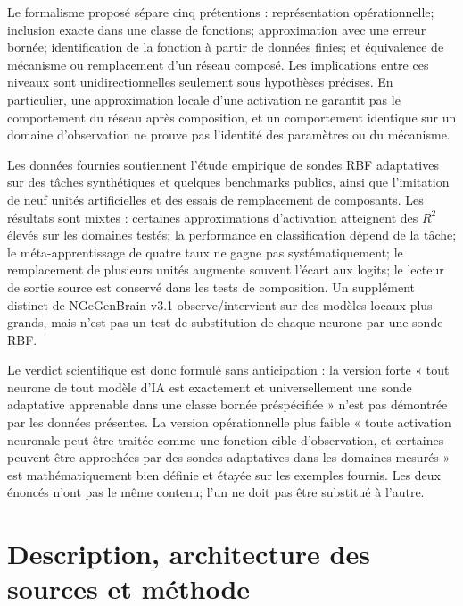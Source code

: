 \documentclass[11pt,a4paper,oneside]{report}
\begin{document}
Le formalisme proposé sépare cinq prétentions : représentation opérationnelle; inclusion exacte dans une classe de fonctions; approximation avec une erreur bornée; identification de la fonction à partir de données finies; et équivalence de mécanisme ou remplacement d'un réseau composé. Les implications entre ces niveaux sont unidirectionnelles seulement sous hypothèses précises. En particulier, une approximation locale d'une activation ne garantit pas le comportement du réseau après composition, et un comportement identique sur un domaine d'observation ne prouve pas l'identité des paramètres ou du mécanisme.

Les données fournies soutiennent l'étude empirique de sondes RBF adaptatives sur des tâches synthétiques et quelques benchmarks publics, ainsi que l'imitation de neuf unités artificielles et des essais de remplacement de composants. Les résultats sont mixtes : certaines approximations d'activation atteignent des \(R^2\) élevés sur les domaines testés; la performance en classification dépend de la tâche; le méta-apprentissage de quatre taux ne gagne pas systématiquement; le remplacement de plusieurs unités augmente souvent l'écart aux logits; le lecteur de sortie source est conservé dans les tests de composition. Un supplément distinct de NGeGenBrain v3.1 observe/intervient sur des modèles locaux plus grands, mais n'est pas un test de substitution de chaque neurone par une sonde RBF.

Le verdict scientifique est donc formulé sans anticipation : la version forte « tout neurone de tout modèle d'IA est exactement et universellement une sonde adaptative apprenable dans une classe bornée préspécifiée » n'est pas démontrée par les données présentes. La version opérationnelle plus faible « toute activation neuronale peut être traitée comme une fonction cible d'observation, et certaines peuvent être approchées par des sondes adaptatives dans les domaines mesurés » est mathématiquement bien définie et étayée sur les exemples fournis. Les deux énoncés n'ont pas le même contenu; l'un ne doit pas être substitué à l'autre.

\chapter{Description, architecture des sources et méthode}
\end{document}
